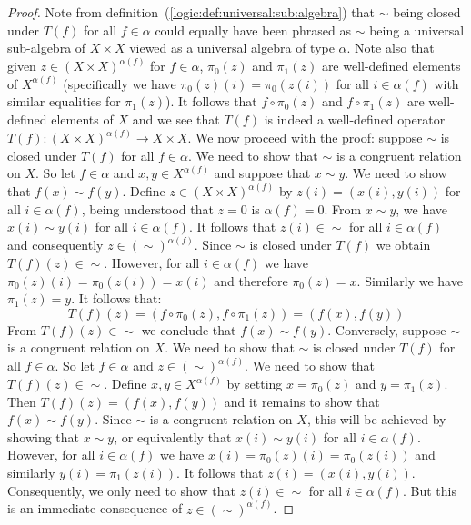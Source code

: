 \begin{proof}
Note from definition~(\ref{logic:def:universal:sub:algebra}) that
$\sim$ being closed under $T(f)$ for all $f\in\alpha$ could equally
have been phrased as $\sim$ being a universal sub-algebra of
$X\times X$ viewed as a universal algebra of type $\alpha$. Note
also that given $z\in(X\times X)^{\alpha(f)}$ for $f\in\alpha$,
$\pi_{0}(z)$ and $\pi_{1}(z)$ are well-defined elements of
$X^{\alpha(f)}$ (specifically we have  $\pi_{0}(z)(i)=\pi_{0}(z(i))$
for all $i\in\alpha(f)$ with similar equalities for $\pi_{1}(z)$).
It follows that $f\circ\pi_{0}(z)$ and $f\circ\pi_{1}(z)$ are
well-defined elements of $X$ and we see that $T(f)$ is indeed a
well-defined operator $T(f):(X\times X)^{\alpha(f)}\to X\times X$.
We now proceed with the proof: suppose $\sim$ is closed under $T(f)$
for all $f\in\alpha$. We need to show that $\sim$ is a congruent
relation on $X$. So let $f\in\alpha$ and $x,y\in X^{\alpha(f)}$ and
suppose that $x\sim y$. We need to show that $f(x)\sim f(y)$. Define
$z\in (X\times X)^{\alpha(f)}$ by $z(i) = (x(i),y(i))$ for all
$i\in\alpha(f)$, being understood that $z=0$ is $\alpha(f)=0$. From
$x\sim y$, we have $x(i)\sim y(i)$ for all $i\in\alpha(f)$. It
follows that $z(i)\in\sim$ for all $i\in\alpha(f)$ and consequently
$z\in(\sim)^{\alpha(f)}$. Since $\sim$ is closed under $T(f)$ we
obtain $T(f)(z)\in\sim$. However, for all $i\in\alpha(f)$ we have
$\pi_{0}(z)(i)=\pi_{0}(z(i))=x(i)$ and therefore $\pi_{0}(z)=x$.
Similarly we have $\pi_{1}(z)=y$. It follows that:
    \[
    T(f)(z)=(f\circ\pi_{0}(z),f\circ\pi_{1}(z)) = (f(x),f(y))
    \]
From $T(f)(z)\in\sim$ we conclude that $f(x)\sim f(y)$. Conversely,
suppose $\sim$ is a congruent relation on $X$. We need to show that
$\sim$ is closed under $T(f)$ for all $f\in\alpha$. So let
$f\in\alpha$ and $z\in(\sim)^{\alpha(f)}$. We need to show that
$T(f)(z)\in\sim$. Define $x,y\in X^{\alpha(f)}$ by setting
$x=\pi_{0}(z)$ and $y=\pi_{1}(z)$. Then $T(f)(z)=(f(x),f(y))$ and it
remains to show that $f(x)\sim f(y)$. Since $\sim$ is a congruent
relation on $X$, this will be achieved by showing that $x\sim y$, or
equivalently that $x(i)\sim y(i)$ for all $i\in\alpha(f)$. However,
for all $i\in\alpha(f)$ we have $x(i)=\pi_{0}(z)(i) = \pi_{0}(z(i))$
and similarly $y(i)=\pi_{1}(z(i))$. It follows that
$z(i)=(x(i),y(i))$. Consequently, we only need to show that
$z(i)\in\sim$ for all $i\in\alpha(f)$. But this is an immediate
consequence of $z\in(\sim)^{\alpha(f)}$.
\end{proof}

